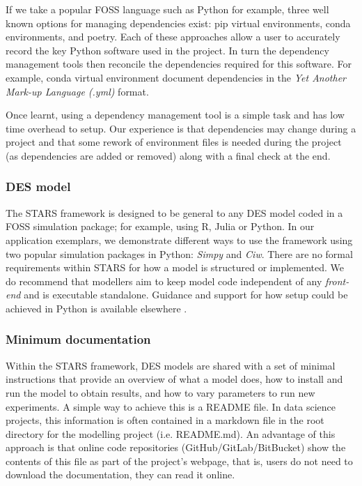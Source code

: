 \documentclass[]{interact}
\theoremstyle{plain}%
\theoremstyle{definition}
\theoremstyle{remark}
\begin{document}
If we take a popular FOSS language such as Python for example, three well known options for managing dependencies exist: pip virtual environments, conda environments, and poetry. Each of these approaches allow a user to accurately record the key Python software used in the project. In turn the dependency management tools then reconcile the dependencies required for this software. For example, conda virtual environment document dependencies in the \textit{Yet Another Mark-up Language (.yml)} format. 

Once learnt, using a dependency management tool is a simple task and has low time overhead to setup. Our experience is that dependencies may change during a project and that some rework of environment files is needed during the project (as dependencies are added or removed) along with a final check at the end.

\subsubsection{DES model}
The STARS framework is designed to be general to any DES model coded in a FOSS simulation package; for example, using R, Julia or Python. In our application exemplars, we demonstrate different ways to use the framework using two popular simulation packages in Python: \textit{Simpy} and \textit{Ciw}. There are no formal requirements within STARS for how a model is structured or implemented.  We do recommend that modellers aim to keep model code independent of any \textit{front-end} and is executable standalone. Guidance and support for how setup could be achieved in Python is available elsewhere \citep{monks2023improving, tom_monks_2023_8101984}. 

\subsubsection{Minimum documentation}

Within the STARS framework, DES models are shared with a set of minimal instructions that provide an overview of what a model does, how to install and run the model to obtain results, and how to vary parameters to run new experiments. A simple way to achieve this is a README file.  In data science projects, this information is often contained in a markdown file in the root directory for the modelling project (i.e. README.md). An advantage of this approach is that online code repositories (GitHub/GitLab/BitBucket) show the contents of this file as part of the project's webpage, that is, users do not need to download the documentation, they can read it online.
\end{document}
